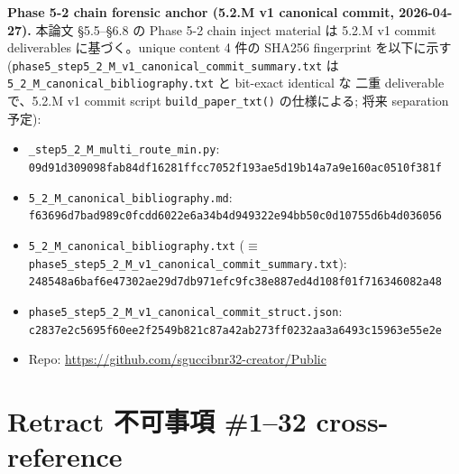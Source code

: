 \documentclass[11pt,a4paper]{ltjsarticle}
\begin{document}
\footnotesize\noindent
\textbf{Phase 5-2 chain forensic anchor (5.2.M v1 canonical commit, 2026-04-27).}
本論文 \S 5.5--\S 6.8 の Phase 5-2 chain inject material は 5.2.M v1 commit
deliverables に基づく。unique content 4 件の SHA256 fingerprint を以下に示す
(\texttt{phase5\_step5\_2\_M\_v1\_canonical\_commit\_summary.txt} は
\texttt{5\_2\_M\_canonical\_bibliography.txt} と bit-exact identical な
二重 deliverable で、5.2.M v1 commit script \texttt{build\_paper\_txt()}
の仕様による; 将来 separation 予定):
\begin{itemize}[leftmargin=*,itemsep=0pt,topsep=2pt]
  \item \texttt{\_step5\_2\_M\_multi\_route\_min.py}: \\
        \texttt{\scriptsize 09d91d309098fab84df16281ffcc7052f193ae5d19b14a7a9e160ac0510f381f}
  \item \texttt{5\_2\_M\_canonical\_bibliography.md}: \\
        \texttt{\scriptsize f63696d7bad989c0fcdd6022e6a34b4d949322e94bb50c0d10755d6b4d036056}
  \item \texttt{5\_2\_M\_canonical\_bibliography.txt}
        ($\equiv$ \texttt{phase5\_step5\_2\_M\_v1\_canonical\_commit\_summary.txt}): \\
        \texttt{\scriptsize 248548a6baf6e47302ae29d7db971efc9fc38e887ed4d108f01f716346082a48}
  \item \texttt{phase5\_step5\_2\_M\_v1\_canonical\_commit\_struct.json}: \\
        \texttt{\scriptsize c2837e2c5695f60ee2f2549b821c87a42ab273ff0232aa3a6493c15963e55e2e}
  \item Repo: \url{https://github.com/sguccibnr32-creator/Public}
\end{itemize}
\normalsize

\section{Retract 不可事項 \#1--32 cross-reference}
\end{document}
